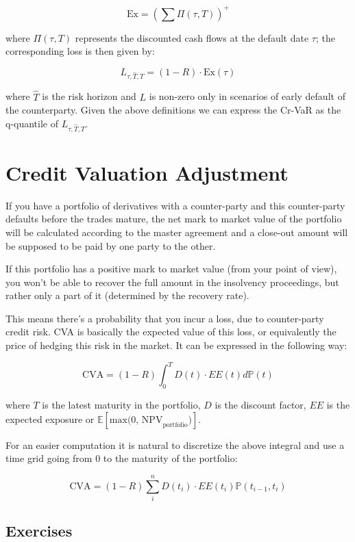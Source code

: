 \[ \textrm{Ex} = (\sum \Pi(\tau, T))^{+}\]

where \(\Pi(\tau,T)\) represents the discounted cash flows at the
default date \(\tau\); the corresponding loss is then given by:

\[L_{\tau, \hat{T}, T} = (1 - R) \cdot \textrm{Ex}(\tau)\]

where \(\hat{T}\) is the risk horizon and \(L\) is non-zero only in
scenarios of early default of the counterparty. Given the above
definitions we can express the Cr-VaR as the q-quantile of
\(L_{\tau, \hat{T}, T}\).

\section{Credit Valuation
Adjustment}\label{credit-valuation-adjustment}

If you have a portfolio of derivatives with a counter-party and this
counter-party defaults before the trades mature, the net mark to market
value of the portfolio will be calculated according to the master
agreement and a close-out amount will be supposed to be paid by one
party to the other.

If this portfolio has a positive mark to market value (from your point
of view), you won't be able to recover the full amount in the insolvency
proceedings, but rather only a part of it (determined by the recovery
rate).

This means there's a probability that you incur a loss, due to
counter-party credit risk. CVA is basically the expected value of this
loss, or equivalently the price of hedging this risk in the market. It
can be expressed in the following way:

\[ \text{CVA} = (1-R) \int_0^T D(t) \cdot EE(t) d\mathbb{P}(t) \]

where \(T\) is the latest maturity in the portfolio, \(D\) is the
discount factor, \(EE\) is the expected exposure or
\(\mathbb{E}[\text{max(0, NPV}_\text{portfolio})]\).

For an easier computation it is natural to discretize the above integral
and use a time grid going from 0 to the maturity of the portfolio:

\[ \text{CVA} = (1-R) \sum_i^n D(t_i) \cdot EE(t_i) \mathbb{P}(t_{i-1}, t_i) \]

\subsection{Exercises}\label{exercises}

